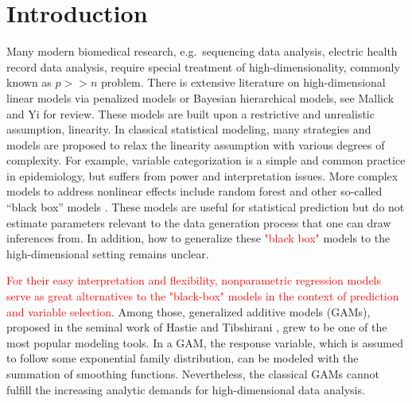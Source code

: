\documentclass[AMA,STIX1COL,]{WileyNJD-v2}
\begin{document}
\pgfplotsset{compat=1.18}
\usetikzlibrary{shapes.geometric, arrows, positioning, calc, matrix, backgrounds, fit}
\newcommand{\bs}[1]{\boldsymbol{#1}}
\newcommand{\tp}{*}
\newcommand{\pr}{\text{Pr}}
\newcommand{\repa}{\text{repa}}
\newcommand{\simiid}{\overset{\text{iid}}{\sim}}
\newcommand{\bg}[1]{\textcolor{red}{#1}}

\section{Introduction}
\label{sec:intro}

Many modern biomedical research, e.g.~sequencing data analysis, electric
health record data analysis, require special treatment of
high-dimensionality, commonly known as \(p >> n\) problem. There is
extensive literature on high-dimensional linear models via penalized
models or Bayesian hierarchical models, see Mallick and Yi
\citep{Mallick2013} for review. These models are built upon a
restrictive and unrealistic assumption, linearity. In classical
statistical modeling, many strategies and models are proposed to relax
the linearity assumption with various degrees of complexity. For
example, variable categorization is a simple and common practice in
epidemiology, but suffers from power and interpretation issues. More
complex models to address nonlinear effects include random forest and
other so-called ``black box'' models \citep{Breiman2001}. These models
are useful for statistical prediction but do not estimate parameters
relevant to the data generation process that one can draw inferences
from. In addition, how to generalize these \textcolor{red}{"black box"}
models to the high-dimensional setting remains unclear.

\textcolor{red}{For their easy interpretation and flexibility, nonparametric regression models serve as great alternatives to the "black-box" models in the context of prediction and variable selection}.
Among those, generalized additive models (GAMs), proposed in the seminal
work of Hastie and Tibshirani \citep{Hastie1987}, grew to be one of the
most popular modeling tools. In a GAM, the response variable, which is
assumed to follow some exponential family distribution, can be modeled
with the summation of smoothing functions. Nevertheless, the classical
GAMs cannot fulfill the increasing analytic demands for high-dimensional
data analysis.
\end{document}
